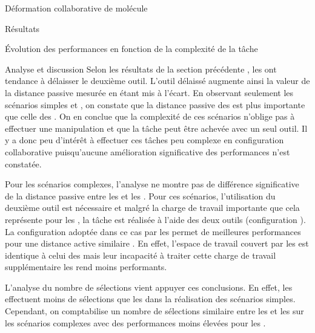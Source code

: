 \documentclass[myfrancais,ngerman,english,frenchb]{mythesis}
\begin{document}
\begin{mychapter}{Déformation collaborative de molécule}
\begin{mysection}{Résultats}
\begin{mysubsection}{Évolution des performances en fonction de la complexité de la tâche}
\begin{mysubsubsection}{Analyse et discussion}
					Selon les résultats de la section précédente , les  ont tendance à délaisser le deuxième outil.
					L'outil délaissé augmente ainsi la valeur de la distance passive mesurée en étant mis à l'écart.
					En observant seulement les scénarios simples  et , on constate que la distance passive des  est plus importante que celle des .
					On en conclue que la complexité de ces scénarios n'oblige pas à effectuer une manipulation  et que la tâche peut être achevée avec un seul outil.
					Il y a donc peu d'intérêt à effectuer ces tâches peu complexe en configuration collaborative puisqu'aucune amélioration significative des performances n'est constatée.

					Pour les scénarios complexes, l'analyse ne montre pas de différence significative de la distance passive entre les  et les .
					Pour ces scénarios, l'utilisation du deuxième outil est nécessaire et malgré la charge de travail importante que cela représente pour les , la tâche est réalisée à l'aide des deux outils (configuration ).
					La configuration  adoptée dans ce cas par les  permet de meilleures performances  pour une distance active similaire .
					En effet, l'espace de travail couvert par les  est identique à celui des  mais leur incapacité à traiter cette charge de travail supplémentaire les rend moins performants.

					L'analyse du nombre de sélections vient appuyer ces conclusions.
					En effet, les  effectuent moins de sélections que les  dans la réalisation des scénarios simples.
					Cependant, on comptabilise un nombre de sélections similaire entre les  et les  sur les scénarios complexes avec des performances moins élevées pour les .


\end{mysubsubsection}
\end{mysubsection}
\end{mysection}
\end{mychapter}
\end{document}
